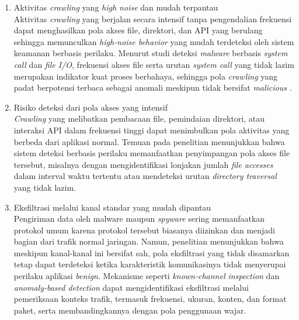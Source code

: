 \begin{enumerate}
    \item Aktivitas \textit{crawling} yang \textit{high noise} dan mudah terpantau \\
    Aktivitas \textit{crawling} yang berjalan secara intensif tanpa pengendalian frekuensi dapat menghasilkan pola akses file, direktori, dan API yang berulang sehingga memunculkan \textit{high-noise behavior} yang mudah terdeteksi oleh sistem keamanan berbasis perilaku. Menurut studi deteksi \textit{malware} berbasis \textit{system call} dan \textit{file I/O}, frekuensi akses file serta urutan \textit{system call} yang tidak lazim merupakan indikator kuat proses berbahaya, sehingga pola \textit{crawling} yang padat berpotensi terbaca sebagai anomali meskipun tidak bersifat \textit{malicious} \autocite{chukwuani2025mltechniques}.

    \item Risiko deteksi dari pola akses yang intensif \\
    \textit{Crawling} yang melibatkan pembacaan file, pemindaian direktori, atau interaksi API dalam frekuensi tinggi dapat menimbulkan pola aktivitas yang berbeda dari aplikasi normal. Temuan pada penelitian \textcite{sheen2022rsentry} menunjukkan bahwa sistem deteksi berbasis perilaku memanfaatkan penyimpangan pola akses file tersebut, misalnya dengan mengidentifikasi lonjakan jumlah \textit{file accesses} dalam interval waktu tertentu atau mendeteksi urutan \textit{directory traversal} yang tidak lazim.

    \item Eksfiltrasi melalui kanal standar yang mudah dipantau \\
    Pengiriman data oleh malware maupun \textit{spyware} sering memanfaatkan protokol umum karena protokol tersebut biasanya diizinkan dan menjadi bagian dari trafik normal jaringan. Namun, penelitian \textcite{ullah2018dataexfiltration} menunjukkan bahwa meskipun kanal-kanal ini bersifat sah, pola eksfiltrasi yang tidak disamarkan tetap dapat terdeteksi ketika karakteristik komunikasinya tidak menyerupai perilaku aplikasi \textit{benign}. Mekanisme seperti \textit{known-channel inspection} dan \textit{anomaly-based detection} dapat mengidentifikasi eksfiltrasi melalui pemeriksaan konteks trafik, termasuk frekuensi, ukuran, konten, dan format paket, serta membandingkannya dengan pola penggunaan wajar.


\end{enumerate}
